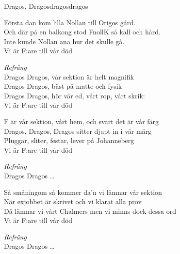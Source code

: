 \begin{song}{Dragos, Dragos}{dragosdragos}

\begin{vers}
Första dan kom lilla Nollan till Origos gård.\\ 
Och där på en balkong stod FnollK så kall och hård.\\
Inte kunde Nollan ana hur det skulle gå.\\
Vi är F:are till vår död \\
\end{vers}

\begin{vers}
\textit{Refräng}\\
Dragos Dragos, vår sektion är helt magnifik \\
Dragos Dragos, bäst på matte och fysik \\
Dragos Dragos, hör vår ed, vårt rop, vårt skrik:\\
Vi är F:are till vår död \\
\end{vers}

\begin{vers}
F är vår sektion, vårt hem, och svart det är vår färg\\
Dragos, Dragos, Dragos sitter djupt in i vår märg\\
Pluggar, sliter, festar, lever på Johanneberg\\
Vi är F:are till vår död\\
\end{vers}

\begin{vers}
\textit{Refräng}\\
Dragos Dragos \ldots
\end{vers}

\begin{vers}
Så småningom så kommer da'n vi lämnar vår sektion\\
När exjobbet är skrivet och vi klarat alla prov\\
Då lämnar vi vårt Chalmers men vi minns dock dessa ord\\
Vi är F:are till vår död\\
\end{vers}

\begin{vers}
\textit{Refräng}\\
Dragos Dragos \ldots
\end{vers}
\end{song}

